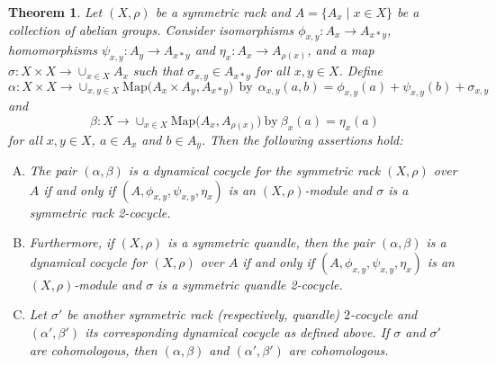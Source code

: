 \documentclass[11pt,reqno]{amsart}
\newtheorem{theorem}{Theorem}[section]
\theoremstyle{definition}
\numberwithin{equation}{subsection}
\newcommand{\Map}{\mathrm{Map}}
\begin{document}
\begin{theorem}\label{dynamical cocycles vs symmetric cocycles}
		 Let $(X,\rho)$ be a symmetric rack and $A=\{A_x \mid x \in X\}$ be a collection of abelian groups. Consider isomorphisms $\phi_{x,y}:A_x \rightarrow A_{x*y}$, homomorphisms $\psi_{x,y}: A_y \rightarrow A_{x*y}$ and $\eta_x: A_x \rightarrow A_{\rho(x)}$, and a map $\sigma:X \times X \rightarrow \cup_{x \in X} A_{x}$ such that $\sigma_{x,y} \in A_{x*y}$ for all $x, y \in X$. Define
$$ \alpha : X \times X \rightarrow \cup_{x,y \in X}\Map \big( A_x \times A_y, A_{x*y}\big)~~\textrm{by}~~\alpha_{x,y}(a,b) = \phi_{x,y}(a)+\psi_{x,y}(b)+\sigma_{x,y} $$
and 
$$ \beta:X \rightarrow \cup_{x \in X}\Map\big( A_x,  A_{\rho(x)}\big)~\textrm{by}~\beta_x(a) = \eta_x(a)$$
		for all $x,y \in X$, $a \in A_x$ and $b \in A_y$.  Then the following assertions hold:
		\begin{enumerate}[(A)]
		\item The pair $(\alpha,\beta)$ is a dynamical cocycle for the symmetric rack $(X,\rho)$ over $A$ if and only if $(A,\phi_{x,y},\psi_{x,y},\eta_x)$ is an $(X,\rho)$-module and $\sigma$ is a symmetric rack 2-cocycle.
		\item[] Furthermore, if $(X,\rho)$ is a symmetric quandle, then the pair $(\alpha,\beta)$ is a dynamical cocycle for  $(X,\rho)$ over $A$ if and only if $(A,\phi_{x,y},\psi_{x,y},\eta_x)$ is an $(X,\rho)$-module and $\sigma$ is a symmetric quandle 2-cocycle.
		\item Let $\sigma'$ be another symmetric rack (respectively, quandle) $2$-cocycle and $(\alpha',\beta')$ its corresponding dynamical cocycle as defined above. If $\sigma$ and $\sigma'$ are cohomologous, then $(\alpha,\beta)$ and $(\alpha',\beta')$ are cohomologous.
	\end{enumerate}	
\end{theorem}
\end{document}
